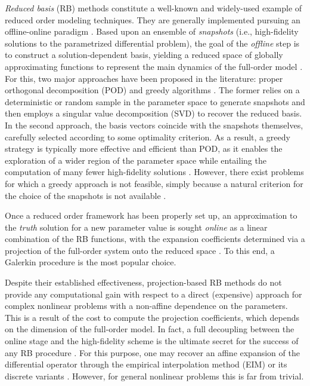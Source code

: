 \documentclass[longtitle]{elsarticle}
\numberwithin{equation}{section}
\theoremstyle{theorem}
\theoremstyle{definition}
\theoremstyle{remark}
\theoremstyle{proposition}
\numberwithin{figure}{section}
\begin{document}
		\emph{Reduced basis} (RB) methods constitute a well-known and widely-used example of reduced order modeling techniques. They are generally implemented pursuing an offline-online paradigm \cite{Mad06}. Based upon an ensemble of \emph{snapshots} (i.e., high-fidelity solutions to the parametrized differential problem), the goal of the \emph{offline} step is to construct a solution-dependent basis, yielding a reduced space of globally approximating functions to represent the main dynamics of the full-order model \cite{Bal14, Chen17}. For this, two major approaches have been proposed in the literature: proper orthogonal decomposition (POD) \cite{Lia02, Vol08} and greedy algorithms \cite{HSZ14}. The former relies on a deterministic or random sample in the parameter space to generate snapshots and then employs a singular value decomposition (SVD) to recover the reduced basis. In the second approach, the basis vectors coincide with the snapshots themselves, carefully selected according to some optimality criterion. As a result, a greedy strategy is typically more effective and efficient than POD, as it enables the exploration of a wider region of the parameter space while entailing the computation of many fewer high-fidelity solutions \cite{HSR16}. However, there exist problems for which a greedy approach is not feasible, simply because a natural criterion for the choice of the snapshots is not available \cite{Bal14}.
		
		Once a reduced order framework has been properly set up, an approximation to the \emph{truth} solution for a new parameter value is sought \emph{online} as a linear combination of the RB functions, with the expansion coefficients determined via a projection of the full-order system onto the reduced space \cite{Buf12}. To this end, a Galerkin procedure is the most popular choice. 
		
		Despite their established effectiveness, projection-based RB methods do not provide any computational gain with respect to a direct (expensive) approach for complex nonlinear problems with a non-affine dependence on the parameters. This is a result of the cost to compute the projection coefficients, which depends on the dimension of the full-order model. In fact, a full decoupling between the online stage and the high-fidelity scheme is the ultimate secret for the success of any RB procedure \cite{QMN15}. For this purpose, one may recover an affine expansion of the differential operator through the empirical interpolation method (EIM) \cite{Bar04} or its discrete variants \cite{Cha10, NMA15}. However, for general nonlinear problems this is far from trivial. 
		
\end{document}
